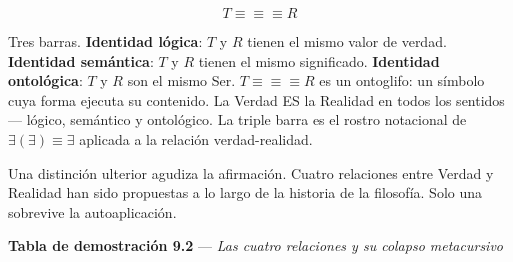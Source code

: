 \documentclass[10pt, openany, oneside]{book}
\begin{document}
$$T \equiv\!\equiv\!\equiv R$$

Tres barras. \textbf{Identidad lógica}: $T$ y $R$ tienen el mismo valor de verdad. \textbf{Identidad semántica}: $T$ y $R$ tienen el mismo significado. \textbf{Identidad ontológica}: $T$ y $R$ son el mismo Ser. $T \equiv\!\equiv\!\equiv R$ es un ontoglifo: un símbolo cuya forma ejecuta su contenido. La Verdad ES la Realidad en todos los sentidos --- lógico, semántico y ontológico. La triple barra es el rostro notacional de $\exists(\exists) \equiv \exists$ aplicada a la relación verdad-realidad.

Una distinción ulterior agudiza la afirmación. Cuatro relaciones entre Verdad y Realidad han sido propuestas a lo largo de la historia de la filosofía. Solo una sobrevive la autoaplicación.

\vspace{0.5em}

\textbf{Tabla de demostración 9.2} --- \textit{Las cuatro relaciones y su colapso metacursivo}

\vspace{0.5em}
\end{document}
